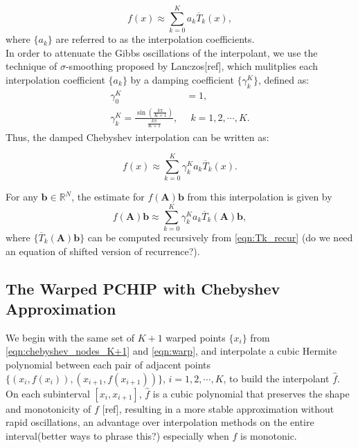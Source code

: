 \documentclass[11pt,letter]{article}
\begin{document}
\begin{equation}
\label{eqn:cheb_interp_f}
f(x)\approx \sum_{k=0}^K a_k\overline{T}_k(x),
\end{equation} where $\{a_k\}$ are referred to as the interpolation coefficients.\\


In order to attenuate the Gibbs oscillations of the interpolant, we use the technique of $\sigma$-smoothing proposed by Lanczos[ref], which mulitplies each interpolation coefficient $\{a_k\}$ by a damping coefficient $\{\gamma_k^K\}$, defined as:
\begin{equation}
\label{eqn:sigma_coef}
\begin{split}
\gamma_0^K&=1,\\
\gamma_{k}^K=\frac{\sin(\frac{k\pi}{K+1})}{\frac{k\pi}{K+1}},&\,\,\,k=1,2,\cdots,K.
\end{split}
\end{equation}
Thus, the damped Chebyshev interpolation can be written as:

\begin{equation}
\label{eqn:cheb_interp_f_damp}
f(x)\approx \sum_{k=0}^K\gamma_{k}^K a_k\overline{T}_k(x).
\end{equation}


For any $\mathbf{b}\in\mathbb{R}^N$, the estimate for $f(\mathbf{A})\mathbf{b}$ from this interpolation is given by
\begin{equation}
\label{eqn:cheb_interp_fab}
f(\mathbf{A})\mathbf{b}\approx \sum_{k=0}^K \gamma_{k}^Ka_k\overline{T}_k(\mathbf{A})\mathbf{b},
\end{equation}
where $\{\overline{T}_k(\mathbf{A})\mathbf{b}\}$ can be computed recursively from \eqref{eqn:Tk_recur} (do we need an equation of shifted version of recurrence?).\\

\subsection{The Warped PCHIP with Chebyshev Approximation}

We begin with the same set of $K+1$ warped points $\{x_i\}$ from \eqref{eqn:chebyshev_nodes_K+1} and \eqref{eqn:warp}, and interpolate a cubic Hermite polynomial between each pair of adjacent points $\{\left(x_i,f(x_i)\right),\left(x_{i+1},f(x_{i+1})\right)\}$, $i=1,2,\cdots,K$, to build the interpolant $\hat{f}$. On each subinterval $[x_i, x_{i+1}]$, $\hat{f}$ is a cubic polynomial that preserves the shape and monotonicity of $f$ [ref], resulting in a more stable approximation without rapid oscillations, an advantage over interpolation methods on the entire interval(better ways to phrase this?) especially when $f$ is monotonic.\\
\end{document}
